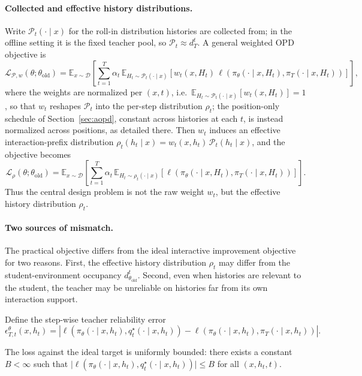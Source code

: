 \paragraph{Collected and effective history distributions.}

Write \(\mathcal P_t(\cdot\mid x)\) for the roll-in distribution histories are collected
from; in the offline setting it is the fixed teacher pool, so
\(\mathcal P_t\approx d_T^{t}\). A general weighted OPD objective is
\begin{equation}
\label{eq:weighted}
\mathcal L_{\mathcal P,w}(\theta;\theta_{\mathrm{old}})
=
\mathbb E_{x\sim\mathcal D}
\left[
\sum_{t=1}^{T}
\alpha_t\,
\mathbb E_{H_t\sim \mathcal P_t(\cdot\mid x)}
\left[
w_t(x,H_t)\,
\ell\left(
\pi_\theta(\cdot\mid x,H_t),
\pi_T(\cdot\mid x,H_t)
\right)
\right]
\right],
\end{equation}
where the weights are normalized per \((x,t)\), i.e.\
\(\mathbb E_{H_t\sim \mathcal P_t(\cdot\mid x)}[w_t(x,H_t)]=1\), so that \(w_t\) reshapes
\(\mathcal P_t\) into the per-step distribution \(\rho_t\); the position-only schedule of
Section~\ref{sec:aopd}, constant across histories at each \(t\), is instead normalized
across positions, as detailed there. Then \(w_t\) induces
an effective interaction-prefix distribution
\(\rho_t(h_t\mid x)=w_t(x,h_t)\,\mathcal P_t(h_t\mid x)\), and the objective becomes
\begin{equation}
\label{eq:rho-obj}
\mathcal L_{\rho}(\theta;\theta_{\mathrm{old}})
=
\mathbb E_{x\sim\mathcal D}
\left[
\sum_{t=1}^{T}
\alpha_t\,
\mathbb E_{H_t\sim \rho_t(\cdot\mid x)}
\left[
\ell\left(
\pi_\theta(\cdot\mid x,H_t),
\pi_T(\cdot\mid x,H_t)
\right)
\right]
\right].
\end{equation}
Thus the central design problem is not the raw weight \(w_t\), but the effective
history distribution \(\rho_t\).

\paragraph{Two sources of mismatch.}

The practical objective differs from the ideal interactive improvement objective
for two reasons. First, the effective history distribution \(\rho_t\) may differ
from the student-environment occupancy \(d_{\theta_{\mathrm{old}}}^{t}\).
Second, even when histories are relevant to the student, the teacher may be
unreliable on histories far from its own interaction support.

Define the step-wise teacher reliability error
\[
\epsilon_{T,t}^{\theta}(x,h_t)
=
\left|
\ell\left(
\pi_\theta(\cdot\mid x,h_t),
q_t^\star(\cdot\mid x,h_t)
\right)
-
\ell\left(
\pi_\theta(\cdot\mid x,h_t),
\pi_T(\cdot\mid x,h_t)
\right)
\right|.
\]
\begin{assumption}
\label{asm:bounded}
The loss against the ideal target is uniformly bounded: there exists a constant
\(B<\infty\) such that
\(\bigl|\ell\left(\pi_\theta(\cdot\mid x,h_t),q_t^\star(\cdot\mid x,h_t)\right)\bigr|\le B\)
for all \((x,h_t,t)\).
\end{assumption}

